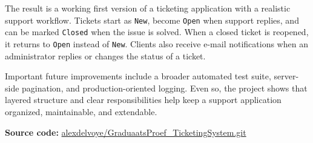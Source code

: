 {The result is a working first version of a ticketing application with a realistic support workflow. Tickets start as \texttt{New}, become \texttt{Open} when support replies, and can be marked \texttt{Closed} when the issue is solved. When a closed ticket is reopened, it returns to \texttt{Open} instead of \texttt{New}. Clients also receive e-mail notifications when an administrator replies or changes the status of a ticket.

\smallskip

Important future improvements include a broader automated test suite, server-side pagination, and production-oriented logging. Even so, the project shows that layered structure and clear responsibilities help keep a support application organized, maintainable, and extendable.

\vfill

\noindent\textbf{Source code:} \href{https://github.com/alexdelvoye/GraduaatsProef_TicketingSystem.git}{alexdelvoye/GraduaatsProef\_TicketingSystem.git}

}{}



